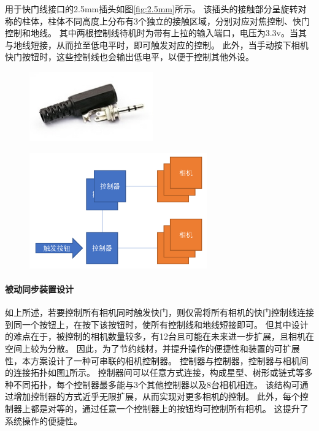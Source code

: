 用于快门线接口的2.5mm插头如图\ref{fig:2.5mm}所示。
该插头的接触部分呈旋转对称的柱体，柱体不同高度上分布有3个独立的接触区域，分别对应对焦控制、快门控制和地线。
其中两根控制线待机时为带有上拉的输入端口，电压为3.3v。当其与地线短接，从而拉至低电平时，即可触发对应的控制。
此外，当手动按下相机快门按钮时，这些控制线也会输出低电平，以便于控制其他外设。

\begin{figure}
\centering
\begin{minipage}{.5\textwidth}
    \centering
    \includegraphics[height=3cm]{figures/2.5mm}
    \label{fig:2.5mm}
\end{minipage}%
\begin{minipage}{.5\textwidth}
    \centering
    \includegraphics[height=5cm]{figures/passive_sync_topo}
    \label{fig:passive_sync_topo}
\end{minipage}%
\end{figure}

\paragraph{被动同步装置设计}
如上所述，若要控制所有相机同时触发快门，则仅需将所有相机的快门控制线连接到同一个按钮上，在按下该按钮时，使所有控制线和地线短接即可。
但其中设计的难点在于，被控制的相机数量较多，有12台且可能在未来进一步扩展，且相机在空间上较为分散。
因此，为了节约线材，并提升操作的便捷性和装置的可扩展性，本方案设计了一种可串联的相机控制器。
控制器与控制器，控制器与相机间的连接拓扑如图\ref{fig:passive_sync_topo}所示。
控制器间可以任意方式连接，构成星型、树形或链式等多种不同拓扑，每个控制器最多能与3个其他控制器以及8台相机相连。
该结构可通过增加控制器的方式近乎无限扩展，从而实现对更多相机的控制。
此外，每个控制器上都是对等的，通过任意一个控制器上的按钮均可控制所有相机。
这提升了系统操作的便捷性。

